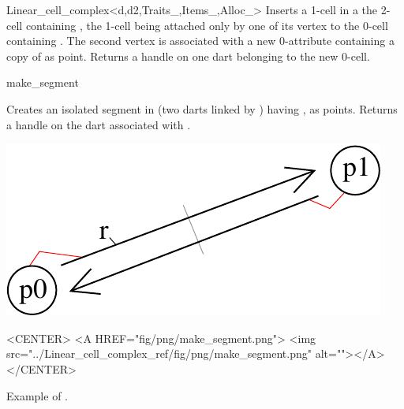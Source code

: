 \begin{ccRefClass}{Linear_cell_complex<d,d2,Traits_,Items_,Alloc_>}
{Inserts a 1-cell in a the 2-cell containing , the 1-cell
  being attached only by one of its vertex to the 0-cell containing .
  The second vertex is associated with a new 0-attribute containing a copy of
   as point. Returns a handle on one dart belonging to the new 0-cell.
}

{make_segment}{}

{Creates an isolated segment in  (two darts linked by \betadeux{}) 
  having ,  as points.
  Returns a handle on the dart associated with .
}
% 
\def\LargFig{.3\textwidth}
\begin{ccTexOnly}
  \begin{center}
    \includegraphics[width=\LargFig]{Linear_cell_complex_ref/fig/pdf/make_segment}
  \end{center}
\end{ccTexOnly}
\begin{ccHtmlOnly}
  <CENTER>
  <A HREF="fig/png/make_segment.png">
  <img src="../Linear_cell_complex_ref/fig/png/make_segment.png" alt=""></A>
  </CENTER>
\end{ccHtmlOnly}
\centerline{Example of .}


\end{ccRefClass}
